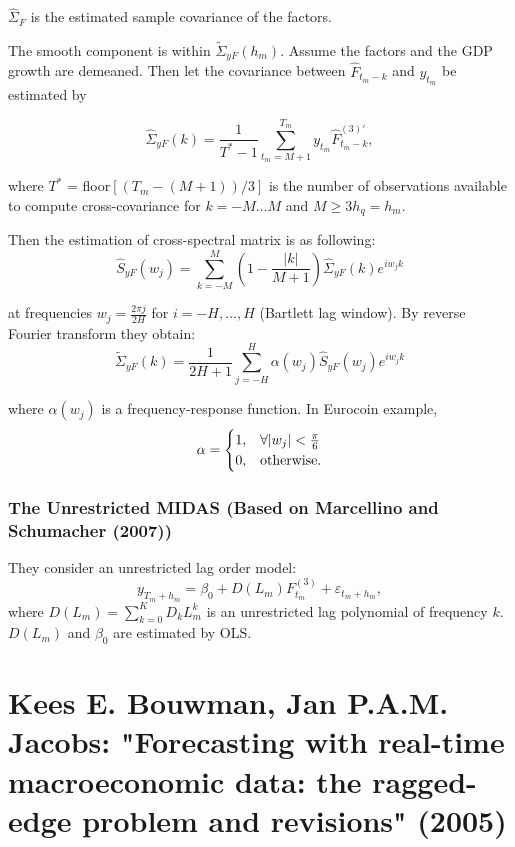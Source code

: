 \documentclass[8pt, a4paper, twocolumn, landscape]{extarticle}
\begin{document}
	$\hat{\Sigma}_F$ is the estimated sample covariance of the factors.
	\medskip
	
	The smooth component is within $\tilde{\Sigma}_{yF}(h_m)$. Assume the factors and the GDP growth are demeaned. Then let the covariance between $\hat{F}_{t_m-k}$ and $y_{t_m}$ be estimated by
	
	\[
	\hat{\Sigma}_{yF}(k) = \frac{1}{T^* - 1}\sum_{t_m = M + 1}^{T_m} y_{t_m} \hat{F}_{t_m - k}^{(3)'},
	\]
	
	where $T^*$ = floor$[(T_m - (M+1))/3]$ is the number of observations available to compute cross-covariance for $k = -M \dots M$ and $M \ge 3h_q = h_m$.
	
	Then the estimation of cross-spectral matrix is as following:
	\[
	\hat{S}_{yF}(w_j) = \sum_{k = -M}^{M} \left( 1 - \frac{|k|}{M + 1} \right) \hat{\Sigma}_{yF}(k)e^{iw_jk}
	\]
	
	at frequencies $w_j = \frac{2\pi j}{2H}$ for $i = -H, \dots, H$ (Bartlett lag window). By reverse Fourier transform they obtain:
	\[
	\tilde{\Sigma}_{yF}(k) = \frac{1}{2H + 1} \sum_{j = -H}^{H} \alpha (w_j) \hat{S}_{yF}(w_j)e^{iw_jk}
	\]
	
	where $\alpha(w_j)$ is a frequency-response function. In Eurocoin example,
	\[
	\alpha = \begin{cases}
	1, & \forall |w_j| < \frac{\pi}{6} \\
	0, & \textnormal{otherwise}.
	\end{cases}
	\]
	
	\subsubsection{The Unrestricted MIDAS (Based on Marcellino and Schumacher (2007))}
	
	They consider an unrestricted lag order model:
	\[
	y_{T_m + h_m} = \beta_0 + D(L_m)F_{t_m}^{(3)} + \varepsilon_{t_m + h_m},
	\]
	where $D(L_m) = \sum_{k = 0}^{K}D_kL_m^k$ is an unrestricted lag polynomial of frequency $k$. $D(L_m)$ and $\beta_0$ are estimated by OLS.
	
	
	\section{Kees E. Bouwman, Jan P.A.M. Jacobs: "Forecasting with real-time macroeconomic data: the ragged-edge problem and revisions" (2005)}

	
\end{document}
